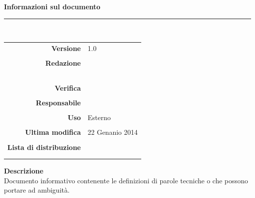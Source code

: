 \begin{titlepage}
\begin{center}
	\vspace{1cm}
	\textbf{Informazioni sul documento}\\
    \rule{10cm}{.4pt} \\
	\begin{table}[h]
	\begin{center}
	\begin{tabular}{r | l}
		\textbf{Versione} & 1.0 \\ \\
		\textbf{Redazione} & \VeFe \\
			& \CaMa \\
			& \MaMo \\
			& \CoMa \\
			& \GoIs \\ \\
		\textbf{Verifica} &\ReAn \\ \\
		\textbf{Responsabile} & \VeFe \\ \\
		\textbf{Uso} & Esterno \\ \\
		\textbf{Ultima modifica} & 22 Genanio 2014 \\ \\
		\textbf{Lista di distribuzione} & \Vardanega \\ 
		    & \Cardin \\
		    & \Zucchetti
	\end{tabular}
	\end{center}
	\end{table}
			\textbf{Descrizione} \\
			Documento informativo contenente le definizioni di parole tecniche o che possono portare ad ambiguità. 
	\end{center}
\end{titlepage}